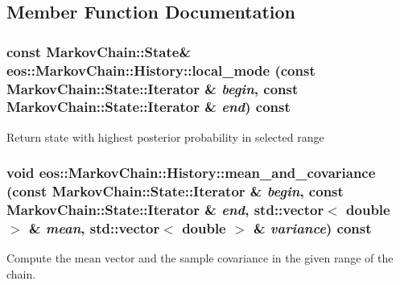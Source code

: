 \subsection{Member Function Documentation}
\hypertarget{structeos_1_1MarkovChain_1_1History_a590c268edb22f3d607dd7757f0bad114}{
\subsubsection[{local\_\-mode}]{\setlength{\rightskip}{0pt plus 5cm}const {\bf MarkovChain::State}\& eos::MarkovChain::History::local\_\-mode (const {\bf MarkovChain::State::Iterator} \& {\em begin}, \/  const {\bf MarkovChain::State::Iterator} \& {\em end}) const}}
\label{structeos_1_1MarkovChain_1_1History_a590c268edb22f3d607dd7757f0bad114}
Return state with highest posterior probability in selected range \hypertarget{structeos_1_1MarkovChain_1_1History_a759445b30a1b1034937969a8db6e7668}{
\subsubsection[{mean\_\-and\_\-covariance}]{\setlength{\rightskip}{0pt plus 5cm}void eos::MarkovChain::History::mean\_\-and\_\-covariance (const {\bf MarkovChain::State::Iterator} \& {\em begin}, \/  const {\bf MarkovChain::State::Iterator} \& {\em end}, \/  std::vector$<$ double $>$ \& {\em mean}, \/  std::vector$<$ double $>$ \& {\em variance}) const}}
\label{structeos_1_1MarkovChain_1_1History_a759445b30a1b1034937969a8db6e7668}
Compute the mean vector and the sample covariance in the given range of the chain.


